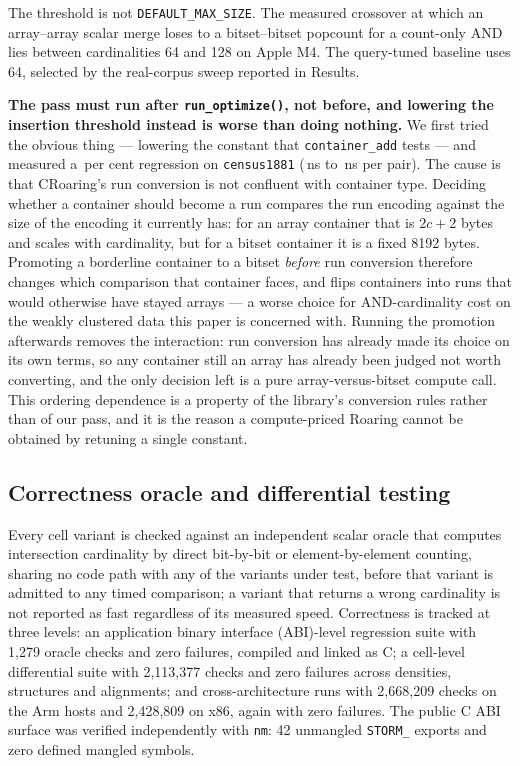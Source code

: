 The threshold is not \texttt{DEFAULT\_MAX\_SIZE}. The measured crossover at which an array--array
scalar merge loses to a bitset--bitset popcount for a count-only AND lies between cardinalities 64
and 128 on Apple M4. The query-tuned baseline uses 64, selected by the real-corpus sweep reported in
Results.

\textbf{The pass must run after \texttt{run\_optimize()}, not before, and lowering the insertion
threshold instead is worse than doing nothing.} We first tried the obvious thing --- lowering the
constant that \texttt{container\_add} tests --- and measured a \,per cent
regression on \texttt{census1881} (\,ns to \,ns per pair). The
cause is that CRoaring's run conversion is not confluent with container type. Deciding whether a
container should become a run compares the run encoding against the size of the encoding it currently
has: for an array container that is $2c+2$ bytes and scales with cardinality, but for a bitset
container it is a fixed 8192 bytes. Promoting a borderline container to a bitset \emph{before} run
conversion therefore changes which comparison that container faces, and flips containers into runs
that would otherwise have stayed arrays --- a worse choice for AND-cardinality cost on the
weakly clustered data this paper is concerned with. Running the promotion afterwards removes the
interaction: run conversion has already made its choice on its own terms, so any container still an
array has already been judged not worth converting, and the only decision left is a pure
array-versus-bitset compute call. This ordering dependence is a property of the library's conversion
rules rather than of our pass, and it is the reason a compute-priced Roaring cannot be obtained by
retuning a single constant.

\subsection*{Correctness oracle and differential testing}

Every cell variant is checked against an independent scalar oracle that computes intersection
cardinality by direct bit-by-bit or element-by-element counting, sharing no code path with any of the
variants under test, before that variant is admitted to any timed comparison; a variant that returns a
wrong cardinality is not reported as fast regardless of its measured speed. Correctness is tracked at
three levels: an application binary interface (ABI)-level regression suite with 1,279 oracle checks and zero failures, compiled and
linked as C; a cell-level differential suite with 2,113,377 checks and zero failures across densities,
structures and alignments; and cross-architecture runs with 2,668,209 checks on the Arm hosts and
2,428,809 on x86, again with zero failures. The public C ABI surface was verified independently with
\texttt{nm}: 42 unmangled \texttt{STORM\_} exports and zero defined mangled symbols.

